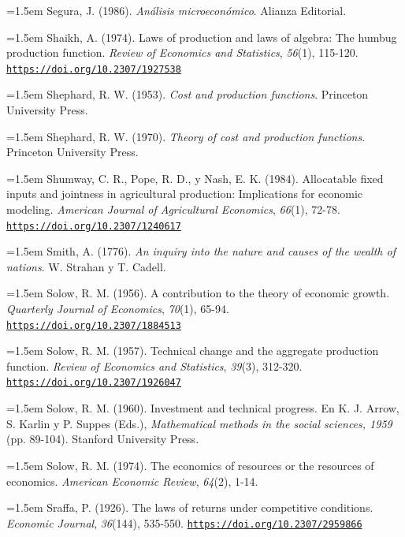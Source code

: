 \documentclass[10pt,a4paper]{article}
\begin{document}
\noindent\hangindent=1.5em Segura, J. (1986). \textit{Análisis microeconómico}. Alianza Editorial.

\noindent\hangindent=1.5em Shaikh, A. (1974). Laws of production and laws of algebra: The humbug production function. \textit{Review of Economics and Statistics}, \textit{56}(1), 115-120. \href{https://doi.org/10.2307/1927538}{\nolinkurl{https://doi.org/10.2307/1927538}}

\noindent\hangindent=1.5em Shephard, R. W. (1953). \textit{Cost and production functions}. Princeton University Press.

\noindent\hangindent=1.5em Shephard, R. W. (1970). \textit{Theory of cost and production functions}. Princeton University Press.

\noindent\hangindent=1.5em Shumway, C. R., Pope, R. D., y Nash, E. K. (1984). Allocatable fixed inputs and jointness in agricultural production: Implications for economic modeling. \textit{American Journal of Agricultural Economics}, \textit{66}(1), 72-78. \href{https://doi.org/10.2307/1240617}{\nolinkurl{https://doi.org/10.2307/1240617}}

\noindent\hangindent=1.5em Smith, A. (1776). \textit{An inquiry into the nature and causes of the wealth of nations}. W. Strahan y T. Cadell.

\noindent\hangindent=1.5em Solow, R. M. (1956). A contribution to the theory of economic growth. \textit{Quarterly Journal of Economics}, \textit{70}(1), 65-94. \href{https://doi.org/10.2307/1884513}{\nolinkurl{https://doi.org/10.2307/1884513}}

\noindent\hangindent=1.5em Solow, R. M. (1957). Technical change and the aggregate production function. \textit{Review of Economics and Statistics}, \textit{39}(3), 312-320. \href{https://doi.org/10.2307/1926047}{\nolinkurl{https://doi.org/10.2307/1926047}}

\noindent\hangindent=1.5em Solow, R. M. (1960). Investment and technical progress. En K. J. Arrow, S. Karlin y P. Suppes (Eds.), \textit{Mathematical methods in the social sciences, 1959} (pp. 89-104). Stanford University Press.

\noindent\hangindent=1.5em Solow, R. M. (1974). The economics of resources or the resources of economics. \textit{American Economic Review}, \textit{64}(2), 1-14.

\noindent\hangindent=1.5em Sraffa, P. (1926). The laws of returns under competitive conditions. \textit{Economic Journal}, \textit{36}(144), 535-550. \href{https://doi.org/10.2307/2959866}{\nolinkurl{https://doi.org/10.2307/2959866}}
\end{document}
